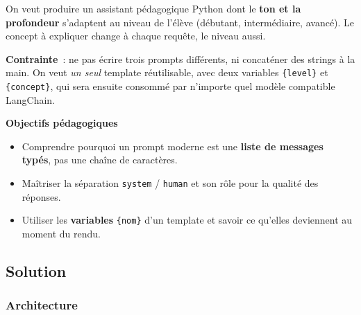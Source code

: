 \documentclass[11pt,a4paper]{article}
\begin{document}
\begin{tcolorbox}[title=Exercice 1. \texttt{ChatPromptTemplate}]
On veut produire un assistant pédagogique Python dont le \textbf{ton et la
profondeur} s'adaptent au niveau de l'élève (débutant, intermédiaire, avancé).
Le concept à expliquer change à chaque requête, le niveau aussi.

\textbf{Contrainte}~: ne pas écrire trois prompts différents, ni concaténer des
strings à la main. On veut \emph{un seul} template réutilisable, avec deux
variables \texttt{\{level\}} et \texttt{\{concept\}}, qui sera ensuite consommé
par n'importe quel modèle compatible LangChain.

\bigskip
\noindent\textbf{Objectifs pédagogiques}
\begin{itemize}[leftmargin=*]
  \item Comprendre pourquoi un prompt moderne est une \textbf{liste de messages typés},
        pas une chaîne de caractères.
  \item Maîtriser la séparation \texttt{system} / \texttt{human} et son rôle pour
        la qualité des réponses.
  \item Utiliser les \textbf{variables} \texttt{\{nom\}} d'un template et savoir
        ce qu'elles deviennent au moment du rendu.
\end{itemize}
\end{tcolorbox}

\subsection{Solution}

\subsubsection{Architecture}

\begin{center}
\end{center}
\end{document}
